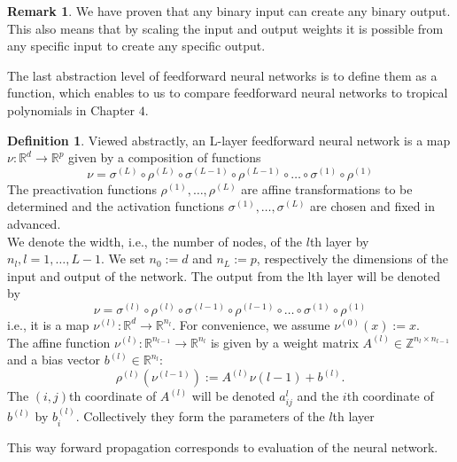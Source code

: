 \documentclass{article}
\theoremstyle{definition}
\newtheorem{definition}[theorem]{Definition}
\newtheorem{comment}[theorem]{Comment}
\newtheorem{remark}[theorem]{Remark}
\begin{document}
\begin{remark}
We have proven that any binary input can create any binary output. This also means that by scaling the input and output weights it is possible from any specific input to create any specific output.

\end{remark}

The last abstraction level of feedforward neural networks is to define them as a function, which enables to us to compare feedforward neural networks to tropical polynomials in Chapter $4$.

\begin{definition}\cite{zhang2018tropical}
Viewed abstractly, an L-layer feedforward neural network is a map $\nu : \mathbb{R}^{d} \to \mathbb{R}^{p}$ given by a composition of functions
$$ \nu = \sigma^{(L)} \circ \rho^{(L)} \circ \sigma^{(L-1)} \circ \rho^{(L-1)} \circ \dots \circ \sigma^{(1)} \circ \rho^{(1)}$$
The preactivation functions $\rho^{(1)}, \dots , \rho^{(L)}$ are affine transformations to be determined and the activation functions $\sigma^{(1)}, \dots , \sigma^{(L)}$ are chosen and fixed in advanced. \\
We denote the width, i.e., the number of nodes, of the $l$th
layer by $n_l, l = 1, \dots , L-1$. We set $n_0 := d$ and $n_L := p$, respectively the dimensions of the input and output of the network. The output from the lth layer will be denoted by
$$\nu = \sigma^{(l)} \circ \rho^{(l)} \circ \sigma^{(l-1)} \circ \rho^{(l-1)} \circ \dots \circ \sigma^{(1)} \circ \rho^{(1)}$$
i.e., it is a map $\nu^{(l)} : \mathbb{R}^{d} \to \mathbb{R}^{n_l}$. For convenience, we assume $\nu^{(0)}(x) := x$. \\
The affine function $\nu^{(l)} : \mathbb{R}^{n_{l-1}} \to \mathbb{R}^{n_{l}}$ is given by a weight matrix $A^{(l)} \in \mathbb{Z}^{n_l \times n_{l-1}} $ and a bias vector $b^{(l)} \in \mathbb{R}^{n_l}$:
$$ \rho^{(l)}(\nu^{(l-1)}) := A^{(l)} \nu{(l-1)} + b^{(l)}. $$
The $(i, j)$th coordinate of $A^{(l)}$ will be denoted $a^{l}_{ij}$ and the $i$th coordinate of $b^{(l)}$ by $b^{(l)}_{i}$. Collectively they form the parameters of the $l$th layer
\end{definition}

This way forward propagation corresponds to evaluation of the neural network.

\end{document}
